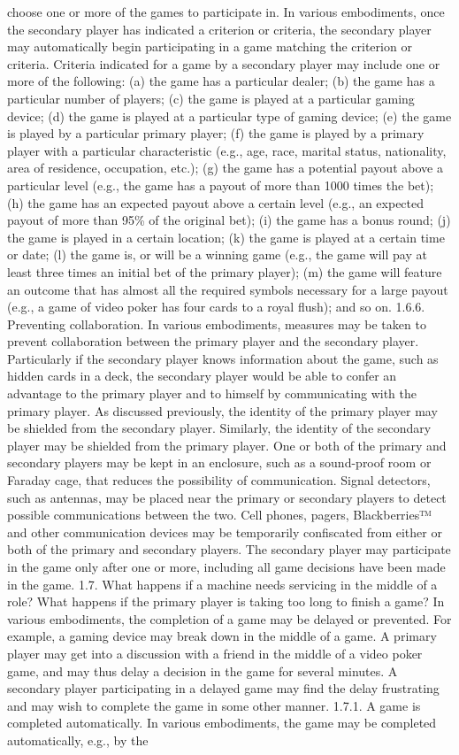 \documentclass[11pt,a4paper]{article}
\begin{document}
choose one or more of the games to participate in. In various embodiments, once the secondary player has indicated a criterion or criteria, the secondary player may automatically begin participating in a game matching the criterion or criteria. Criteria indicated for a game by a secondary player may include one or more of the following: (a) the game has a particular dealer; (b) the game has a particular number of players; (c) the game is played at a particular gaming device; (d) the game is played at a particular type of gaming device; (e) the game is played by a particular primary player; (f) the game is played by a primary player with a particular characteristic (e.g., age, race, marital status, nationality, area of residence, occupation, etc.); (g) the game has a potential payout above a particular level (e.g., the game has a payout of more than 1000 times the bet); (h) the game has an expected payout above a certain level (e.g., an expected payout of more than 95\% of the original bet); (i) the game has a bonus round; (j) the game is played in a certain location; (k) the game is played at a certain time or date; (l) the game is, or will be a winning game (e.g., the game will pay at least three times an initial bet of the primary player); (m) the game will feature an outcome that has almost all the required symbols necessary for a large payout (e.g., a game of video poker has four cards to a royal flush); and so on. 1.6.6. Preventing collaboration. In various embodiments, measures may be taken to prevent collaboration between the primary player and the secondary player. Particularly if the secondary player knows information about the game, such as hidden cards in a deck, the secondary player would be able to confer an advantage to the primary player and to himself by communicating with the primary player. As discussed previously, the identity of the primary player may be shielded from the secondary player. Similarly, the identity of the secondary player may be shielded from the primary player. One or both of the primary and secondary players may be kept in an enclosure, such as a sound-proof room or Faraday cage, that reduces the possibility of communication. Signal detectors, such as antennas, may be placed near the primary or secondary players to detect possible communications between the two. Cell phones, pagers, Blackberries™ and other communication devices may be temporarily confiscated from either or both of the primary and secondary players. The secondary player may participate in the game only after one or more, including all game decisions have been made in the game. 1.7. What happens if a machine needs servicing in the middle of a role? What happens if the primary player is taking too long to finish a game? In various embodiments, the completion of a game may be delayed or prevented. For example, a gaming device may break down in the middle of a game. A primary player may get into a discussion with a friend in the middle of a video poker game, and may thus delay a decision in the game for several minutes. A secondary player participating in a delayed game may find the delay frustrating and may wish to complete the game in some other manner. 1.7.1. A game is completed automatically. In various embodiments, the game may be completed automatically, e.g., by the 
\end{document}
